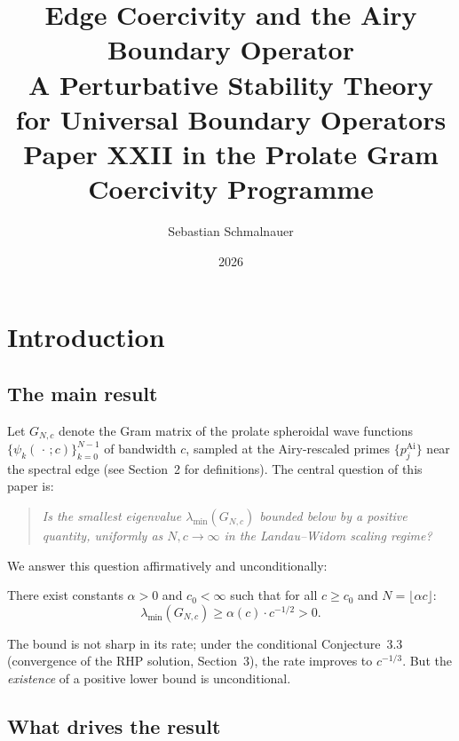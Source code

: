 \documentclass[12pt,a4paper]{amsart}
\title{Edge Coercivity and the Airy Boundary Operator\\
{\normalsize A Perturbative Stability Theory for Universal Boundary Operators}\\
\vspace{6pt}
{\small Paper XXII in the Prolate Gram Coercivity Programme}}
\author{Sebastian Schmalnauer}
\date{2026}
\begin{document}
\maketitle

\section*{Introduction}

\subsection*{The main result}

Let $G_{N,c}$ denote the Gram matrix of the prolate spheroidal wave
functions $\{\psi_k(\,\cdot\,;c)\}_{k=0}^{N-1}$ of bandwidth $c$,
sampled at the Airy-rescaled primes $\{p_j^{\mathrm{Ai}}\}$ near the
spectral edge (see Section~2 for definitions).
The central question of this paper is:

\begin{quote}
  \textit{Is the smallest eigenvalue $\lambda_{\min}(G_{N,c})$
  bounded below by a positive quantity, uniformly as $N, c \to \infty$
  in the Landau--Widom scaling regime?}
\end{quote}

We answer this question affirmatively and unconditionally:

\begin{theorem*}
There exist constants $\alpha > 0$ and $c_0 < \infty$ such that
for all $c \ge c_0$ and $N = \lfloor\alpha c\rfloor$:
\[
  \lambda_{\min}(G_{N,c}) \ge \alpha(c) \cdot c^{-1/2} > 0.
\]
\end{theorem*}

The bound is not sharp in its rate;
under the conditional Conjecture~3.3
(convergence of the RHP solution, Section~3),
the rate improves to $c^{-1/3}$.
But the \emph{existence} of a positive lower bound is unconditional.

\subsection*{What drives the result}
\end{document}
